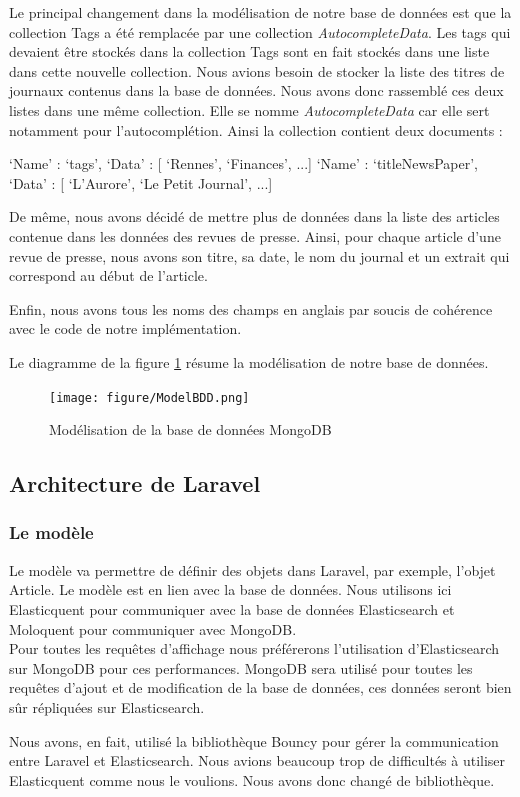 Le principal changement dans la modélisation de notre base de données est que la collection Tags a été remplacée par une collection \textit{AutocompleteData}. Les tags qui devaient être stockés dans la collection Tags sont en fait stockés dans une liste dans cette nouvelle collection. Nous avions besoin de stocker la liste des titres de journaux contenus dans la base de données. Nous avons donc rassemblé ces deux listes dans une même collection. Elle se nomme \textit{AutocompleteData} car elle sert notamment pour l'autocomplétion. Ainsi la collection contient deux documents :

\begin{verbatimtab}[3]
{
	‘Name’ : ‘tags’,
	‘Data’ : [ ‘Rennes’, ‘Finances’, ...]
}
{
	‘Name’ : ‘titleNewsPaper’,
	‘Data’ : [ ‘L'Aurore’, ‘Le Petit Journal’, ...]
}
\end{verbatimtab}


De même, nous avons décidé de mettre plus de données dans la liste des articles contenue dans les données des revues de presse. Ainsi, pour chaque article d'une revue de presse, nous avons son titre, sa date, le nom du journal et un extrait qui correspond au début de l'article.

Enfin, nous avons tous les noms des champs en anglais par soucis de cohérence avec le code de notre implémentation.

Le diagramme de la figure \ref{modelbdd} résume la modélisation de notre base de données.

\begin{figure}[H]
        \centering
        \texttt{[image: figure/ModelBDD.png]}
            \caption{Modélisation de la base de données MongoDB}
            \label{modelbdd}
\end{figure}

\subsection{Architecture de Laravel}

\subsubsection{Le modèle}

\begin{leftonly}
	Le modèle va permettre de définir des objets dans Laravel, par exemple, l'objet Article. Le modèle est en lien avec la base de données. Nous utilisons ici Elasticquent\cite{GitElasticquent} pour communiquer avec la base de données Elasticsearch et Moloquent\cite{GitLaravelMongo} pour communiquer avec MongoDB.\\ Pour toutes les requêtes d'affichage nous préférerons l'utilisation d'Elasticsearch sur MongoDB pour ces performances. MongoDB sera utilisé pour toutes les requêtes d'ajout et de modification de la base de données, ces données seront bien sûr répliquées sur Elasticsearch.
\end{leftonly}

Nous avons, en fait, utilisé la bibliothèque Bouncy\cite{GitBouncy} pour gérer la communication entre Laravel et Elasticsearch. Nous avions beaucoup trop de difficultés à utiliser Elasticquent comme nous le voulions. Nous avons donc changé de bibliothèque.

